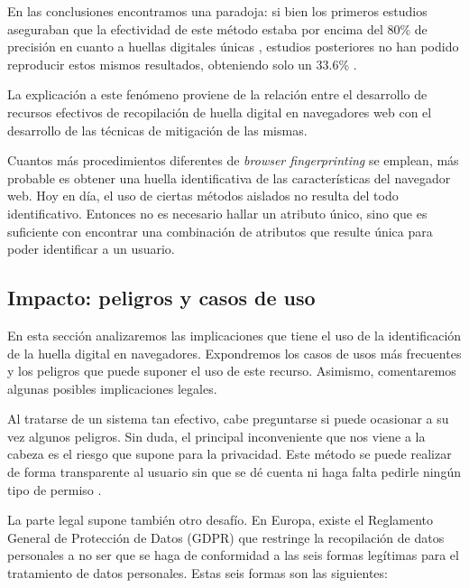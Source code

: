 En las conclusiones encontramos una paradoja: si bien los primeros estudios aseguraban que la efectividad de este método estaba por encima del 80\% de precisión en cuanto a huellas digitales únicas \cite{panop_paper, javascript_paper}, estudios posteriores no han podido reproducir estos mismos resultados, obteniendo solo un 33.6\% \cite{effective_paper}. \par

La explicación a este fenómeno proviene de la relación entre el desarrollo de recursos efectivos de recopilación de huella digital en navegadores web con el desarrollo de las técnicas de mitigación de las mismas. \par 

Cuantos más procedimientos diferentes de \textit{browser fingerprinting} se emplean, más probable es obtener una huella identificativa de las características del navegador web. Hoy en día, el uso de ciertas métodos aislados no resulta del todo identificativo. Entonces no es necesario hallar un atributo único, sino que es suficiente con encontrar una combinación de atributos que resulte única para poder identificar a un usuario. \par

\subsection{Impacto: peligros y casos de uso}

En esta sección analizaremos las implicaciones que tiene el uso de la identificación de la huella digital en navegadores. Expondremos los casos de usos más frecuentes y los peligros que puede suponer el uso de este recurso. Asimismo, comentaremos algunas posibles implicaciones legales. \par

Al tratarse de un sistema tan efectivo, cabe preguntarse si puede ocasionar a su vez algunos peligros. Sin duda, el principal inconveniente que nos viene a la cabeza es el riesgo que supone para la privacidad. Este método se puede realizar de forma transparente al usuario sin que se dé cuenta ni haga falta pedirle ningún tipo de permiso \cite{challenges}. \par 

La parte legal supone también otro desafío. En Europa, existe el Reglamento General de Protección de Datos (GDPR) que restringe la recopilación de datos personales a no ser que se haga de conformidad a las seis formas legítimas para el tratamiento de datos personales. Estas seis formas son las siguientes: \par


